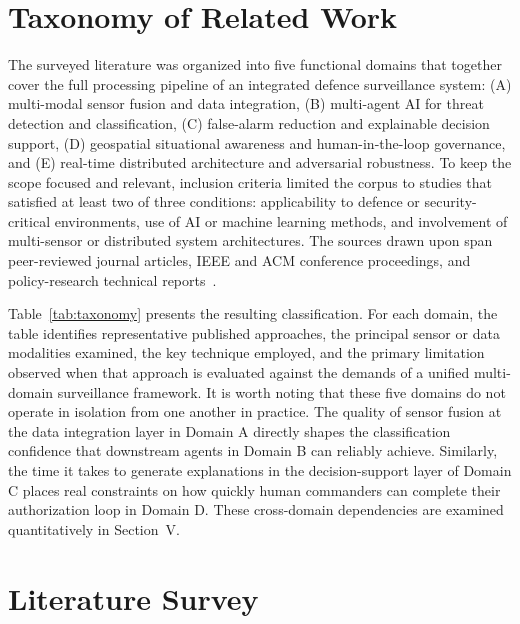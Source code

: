 
\section{Taxonomy of Related Work}
\label{sec:taxonomy}

The surveyed literature was organized into five functional domains that together cover the full processing pipeline of an integrated defence surveillance system: (A) multi-modal sensor fusion and data integration, (B) multi-agent AI for threat detection and classification, (C) false-alarm reduction and explainable decision support, (D) geospatial situational awareness and human-in-the-loop governance, and (E) real-time distributed architecture and adversarial robustness. To keep the scope focused and relevant, inclusion criteria limited the corpus to studies that satisfied at least two of three conditions: applicability to defence or security-critical environments, use of AI or machine learning methods, and involvement of multi-sensor or distributed system architectures. The sources drawn upon span peer-reviewed journal articles, IEEE and ACM conference proceedings, and policy-research technical reports~\cite{cset2024maven, cset2025ai}.

Table~\ref{tab:taxonomy} presents the resulting classification. For each domain, the table identifies representative published approaches, the principal sensor or data modalities examined, the key technique employed, and the primary limitation observed when that approach is evaluated against the demands of a unified multi-domain surveillance framework. It is worth noting that these five domains do not operate in isolation from one another in practice. The quality of sensor fusion at the data integration layer in Domain A directly shapes the classification confidence that downstream agents in Domain B can reliably achieve. Similarly, the time it takes to generate explanations in the decision-support layer of Domain C places real constraints on how quickly human commanders can complete their authorization loop in Domain D. These cross-domain dependencies are examined quantitatively in Section~V.



\section{Literature Survey}
\label{sec:survey}

